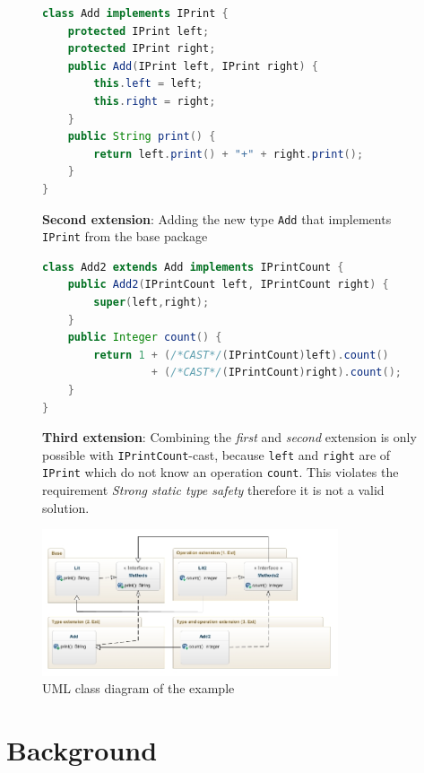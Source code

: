 \documentclass{report}
\begin{document}
\begin{figure}[H]
\begin{lstlisting}[language=java]
class Add implements IPrint {
    protected IPrint left;
    protected IPrint right;
    public Add(IPrint left, IPrint right) {
        this.left = left;
        this.right = right;
    }
    public String print() {
        return left.print() + "+" + right.print();
    }
}
\end{lstlisting}
\caption{\textbf{Second extension}: Adding the new type \lstinline{Add} that implements \lstinline{IPrint} from the base package}
\label{exampleSecondExtension}
\end{figure}
\begin{figure}[H]
\begin{lstlisting}[language=java,commentstyle=\color{red}]
class Add2 extends Add implements IPrintCount {
    public Add2(IPrintCount left, IPrintCount right) {
        super(left,right);
    }
    public Integer count() {
        return 1 + (/*CAST*/(IPrintCount)left).count() 
                 + (/*CAST*/(IPrintCount)right).count();
    }
}
\end{lstlisting}
\caption{\textbf{Third extension}: Combining the \emph{first} and \emph{second} extension is only possible with \lstinline{IPrintCount}-cast, because \lstinline{left} and \lstinline{right} are of \lstinline{IPrint} which do not know an operation \lstinline{count}. This violates the requirement \emph{Strong static type safety} therefore it is not a valid solution.}
\label{exampleThirdExtension}
\end{figure}

\begin{figure}[H]

\includegraphics[width=330px,keepaspectratio=true]{Expression_problem-diag.jpg}

\caption{UML class diagram of the example}
\label{exampleClassDiagram}
\end{figure}

\section{Background}
\end{document}
